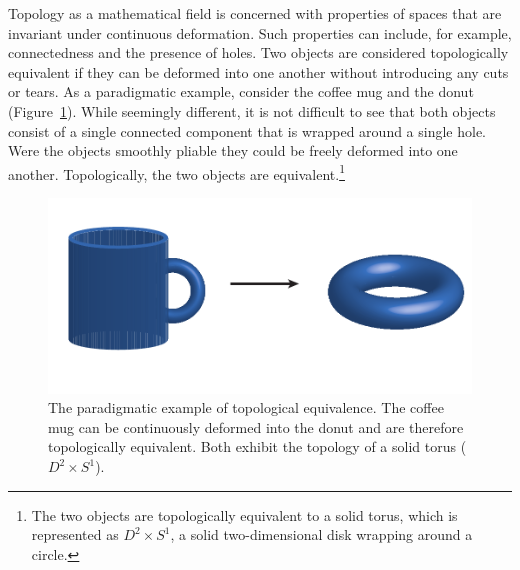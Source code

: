 Topology as a mathematical field is concerned with properties of spaces that are invariant under continuous deformation.
Such properties can include, for example, connectedness and the presence of holes.
Two objects are considered topologically equivalent if they can be deformed into one another without introducing any cuts or tears.
As a paradigmatic example, consider the coffee mug and the donut (Figure~\ref{intro:fig:coffeemug_to_donut}).
While seemingly different, it is not difficult to see that both objects consist of a single connected component that is wrapped around a single hole.
Were the objects smoothly pliable they could be freely deformed into one another.
Topologically, the two objects are equivalent.\footnote{The two objects are topologically equivalent to a solid torus, which is represented as $D^2\times S^1$, a solid two-dimensional disk wrapping around a circle.}

\begin{figure}[t]
\centering
\includegraphics[width=\columnwidth]{./fig/introduction/coffeemug_to_donut.pdf}
\caption[Topological equivalence of the coffee mug and the donut]{The paradigmatic example of topological equivalence. The coffee mug can be continuously deformed into the donut and are therefore topologically equivalent. Both exhibit the topology of a solid torus ($D^2\times S^1$).}
\label{intro:fig:coffeemug_to_donut}
\end{figure}

